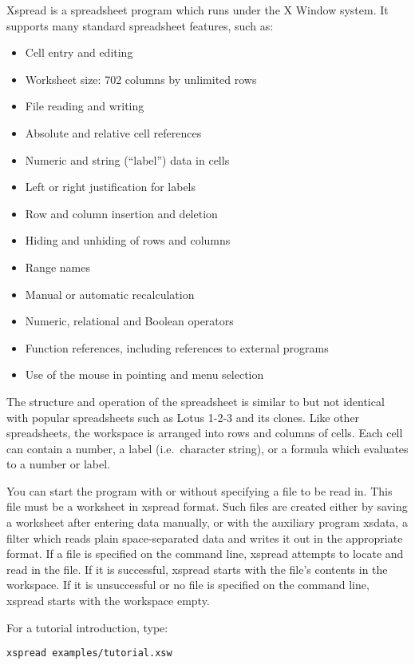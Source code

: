 \documentclass[titlepage]{article}
\begin{document}
\textsf{Xspread} is a spreadsheet program which runs under the X
Window system.  It supports many standard spreadsheet features, such
as:
\begin{itemize}
\item Cell entry and editing
\item Worksheet size: 702 columns by unlimited rows
\item File reading and writing
\item Absolute and relative cell references
\item Numeric and string (``label'') data in cells
\item Left or right justification for labels
\item Row and column insertion and deletion
\item Hiding and unhiding of rows and columns
\item Range names
\item Manual or automatic recalculation
\item Numeric, relational and Boolean operators
\item Function references, including references to external programs
\item Use of the mouse in pointing and menu selection
\end{itemize}

The structure and operation of the spreadsheet is similar to but not
identical with popular spreadsheets such as \textsf{Lotus 1-2-3} and
its clones.  Like other spreadsheets, the workspace is arranged into
rows and columns of cells.  Each cell can contain a number, a label
(i.e.\ character string), or a formula which evaluates to a number or
label.

You can start the program with or without specifying a file to be read
in.  This file must be a worksheet in \textsf{xspread} format.  Such
files are created either by saving a worksheet after entering data
manually, or with the auxiliary program \textsf{xsdata}, a filter
which reads plain space-separated data and writes it out in the
appropriate format.  If a file is specified on the command line,
\textsf{xspread} attempts to locate and read in the file.  If it is
successful, \textsf{xspread} starts with the file's contents in the
workspace.  If it is unsuccessful or no file is specified on the
command line, \textsf{xspread} starts with the workspace empty.

For a tutorial introduction, type:

\begin{center}
  \texttt{xspread examples/tutorial.xsw}
\end{center}
\end{document}
